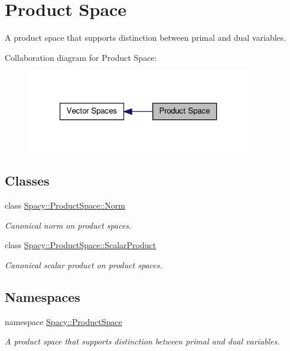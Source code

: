 \hypertarget{group__ProductSpaceGroup}{\section{\-Product \-Space}
\label{group__ProductSpaceGroup}
}


\-A product space that supports distinction between primal and dual variables.  


\-Collaboration diagram for \-Product \-Space\-:
\nopagebreak
\begin{figure}[H]
\begin{center}
\leavevmode
\includegraphics[width=280pt]{group__ProductSpaceGroup}
\end{center}
\end{figure}
\subsection*{\-Classes}
\begin{DoxyCompactItemize}
\item 
class \hyperlink{classSpacy_1_1ProductSpace_1_1Norm}{\-Spacy\-::\-Product\-Space\-::\-Norm}
\begin{DoxyCompactList}\small\item\em \-Canonical norm on product spaces. \end{DoxyCompactList}\item 
class \hyperlink{classSpacy_1_1ProductSpace_1_1ScalarProduct}{\-Spacy\-::\-Product\-Space\-::\-Scalar\-Product}
\begin{DoxyCompactList}\small\item\em \-Canonical scalar product on product spaces. \end{DoxyCompactList}\end{DoxyCompactItemize}
\subsection*{\-Namespaces}
\begin{DoxyCompactItemize}
\item 
namespace \hyperlink{namespaceSpacy_1_1ProductSpace}{\-Spacy\-::\-Product\-Space}
\begin{DoxyCompactList}\small\item\em \-A product space that supports distinction between primal and dual variables. \end{DoxyCompactList}\end{DoxyCompactItemize}
